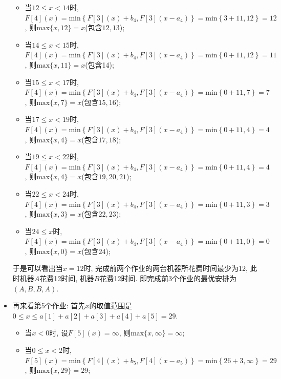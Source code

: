 \documentclass{article}
\begin{document}
\begin{homeworkProblem}
\begin{itemize}
\begin{itemize}
			\item 当$12\leq x<14$时, $F\left[ 4 \right] \left( x \right) =\text{min} \left\{ F\left[ 3 \right] \left( x \right) +b_4,F\left[ 3 \right] \left( x-a_4 \right) \right\} =\text{min} \left\{ 3+11,12 \right\} =12$, 则$\text{max}\{x,12\}=x$(包含$12,13$);
			\item 当$14\leq x<15$时, $F\left[ 4 \right] \left( x \right) =\text{min} \left\{ F\left[ 3 \right] \left( x \right) +b_4,F\left[ 3 \right] \left( x-a_4 \right) \right\} =\text{min} \left\{ 0+11,12 \right\} =11$, 则$\text{max}\{x,11\}=x$(包含14);
			\item 当$15\leq x<17$时, $F\left[ 4 \right] \left( x \right) =\text{min} \left\{ F\left[ 3 \right] \left( x \right) +b_4,F\left[ 3 \right] \left( x-a_4 \right) \right\} =\text{min} \left\{ 0+11,7 \right\} =7$, 则$\text{max}\{x,7\}=x$(包含$15,16$);
			\item 当$17\leq x<19$时, $F\left[ 4 \right] \left( x \right) =\text{min} \left\{ F\left[ 3 \right] \left( x \right) +b_4,F\left[ 3 \right] \left( x-a_4 \right) \right\} =\text{min} \left\{ 0+11,4 \right\} =4$, 则$\text{max}\{x,4\}=x$(包含$17,18$);
			\item 当$19\leq x<22$时, $F\left[ 4 \right] \left( x \right) =\text{min} \left\{ F\left[ 3 \right] \left( x \right) +b_4,F\left[ 3 \right] \left( x-a_4 \right) \right\} =\text{min} \left\{ 0+11,4 \right\} =4$, 则$\text{max}\{x,4\}=x$(包含$19,20,21$);
			\item 当$22\leq x<24$时, $F\left[ 4 \right] \left( x \right) =\text{min} \left\{ F\left[ 3 \right] \left( x \right) +b_4,F\left[ 3 \right] \left( x-a_4 \right) \right\} =\text{min} \left\{ 0+11,3 \right\} =3$, 则$\text{max}\{x,3\}=x$(包含$22,23$);
			\item 当$24\leq x$时, $F\left[ 4 \right] \left( x \right) =\text{min} \left\{ F\left[ 3 \right] \left( x \right) +b_4,F\left[ 3 \right] \left( x-a_4 \right) \right\} =\text{min} \left\{ 0+11,0 \right\} =0	$, 则$\text{max}\{x,0\}=x$(包含$24$);
		\end{itemize}
		于是可以看出当$x=12$时, 完成前两个作业的两台机器所花费时间最少为12, 此时机器$A$花费12时间, 机器$B$花费12时间. 即完成前3个作业的最优安排为$(A,B,B,A)$.
		\item 再来看第5个作业: 首先$x$的取值范围是$0\leq x\leq a[1]+a[2]+a[3]+a[4]+a[5]=29$.
		\begin{itemize}
			\item 当$x<0$时, 设$F[5](x)=\infty$, 则$\text{max}\{x,\infty\}=\infty$;
			\item 当$0\leq x < 2$时, $F\left[ 5 \right] \left( x \right) =\text{min} \left\{ F\left[ 4 \right] \left( x \right) +b_5,F\left[ 4 \right] \left( x-a_5 \right) \right\} =\text{min} \left\{ 26+3,\infty \right\} =29$, 则$\text{max}\{x,29\}=29$;

\end{itemize}
\end{itemize}
\end{homeworkProblem}
\end{document}
